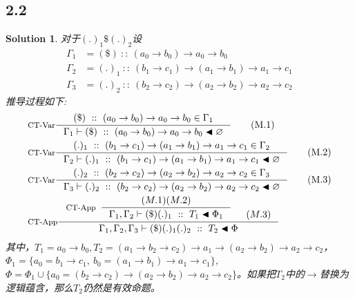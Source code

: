 \documentclass[11pt, a4paper]{article}
\newtheorem{Solution}{Solution}
\let\emptyset\varnothing
\begin{document}
    \subsection*{2.2}
    \begin{Solution}
        对于$(.)_1\$(.)_2$设
        \begin{align*}
            \Gamma_1 &= (\$)~::~(a_0\rightarrow b_0)\rightarrow a_0 \rightarrow b_0 \\
            \Gamma_2 &= (.)_1~::~(b_1\rightarrow c_1)\rightarrow (a_1\rightarrow b_1)\rightarrow a_1\rightarrow c_1 \\
            \Gamma_3 &= (.)_2~::~(b_2\rightarrow c_2)\rightarrow (a_2\rightarrow b_2)\rightarrow a_2\rightarrow c_2
        \end{align*}
        推导过程如下:
        \begin{align}
            &\inference[CT-Var]{(\$)~::~(a_0\rightarrow b_0)\rightarrow a_0 \rightarrow b_0 \in \Gamma_1}{\Gamma_1 \vdash (\$)~::~(a_0\rightarrow b_0)\rightarrow a_0 \rightarrow b_0 \blacktriangleleft \emptyset} \tag{M.1} \\
            &\inference[CT-Var]{(.)_1~::~(b_1\rightarrow c_1)\rightarrow (a_1\rightarrow b_1)\rightarrow a_1\rightarrow c_1 \in \Gamma_2}{\Gamma_2 \vdash (.)_1~::~(b_1\rightarrow c_1)\rightarrow (a_1\rightarrow b_1)\rightarrow a_1\rightarrow c_1 \blacktriangleleft \emptyset} \tag{M.2} \\
            &\inference[CT-Var]{(.)_2~::~(b_2\rightarrow c_2)\rightarrow (a_2\rightarrow b_2)\rightarrow a_2\rightarrow c_2 \in \Gamma_3}{\Gamma_3 \vdash (.)_2~::~(b_2\rightarrow c_2)\rightarrow (a_2\rightarrow b_2)\rightarrow a_2\rightarrow c_2 \blacktriangleleft \emptyset} \tag{M.3} \\
            &\inference[CT-App]{\inference[CT-App]{(M.1)(M.2)}{\Gamma_1, \Gamma_2 \vdash (\$)(.)_1~::~T_1 \blacktriangleleft \Phi_1} & (M.3)}{\Gamma_1, \Gamma_2, \Gamma_3 \vdash (\$) (.)_1 (.)_2~::~T_2  \blacktriangleleft \Phi} \notag
        \end{align}
        其中，$T_1=a_0\rightarrow b_0, T_2=(a_1\rightarrow b_2 \rightarrow c_2)\rightarrow a_1 \rightarrow (a_2\rightarrow b_2)\rightarrow a_2 \rightarrow c_2$，$\Phi_1=\{a_0=b_1\rightarrow c_1,~b_0=(a_1\rightarrow b_1)\rightarrow a_1\rightarrow c_1\}$,$\Phi=\Phi_1\cup \{a_0=(b_2\rightarrow c_2)\rightarrow (a_2\rightarrow b_2)\rightarrow a_2\rightarrow c_2\}$。如果把$T_2$中的$\rightarrow$替换为逻辑蕴含，那么$T_2$仍然是有效命题。
    \end{Solution}
\end{document}
